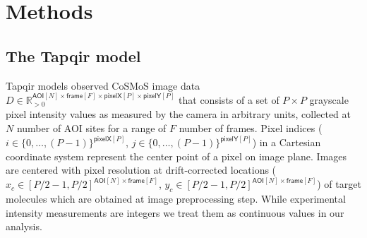 \section*{Methods}

\subsection*{The Tapqir model} 

Tapqir models observed CoSMoS image data $D \in \mathbb{R}_{>0}^{\mathsf{AOI}[N] \times \mathsf{frame}[F] \times \mathsf{pixelX}[P] \times \mathsf{pixelY}[P]}$ that consists of a set of $P \times P$ grayscale pixel intensity values as measured by the camera in arbitrary units, collected at $N$ number of AOI sites for a range of $F$ number of frames. Pixel indices ($i \in \{0, \dots, (P-1)\}^{\mathsf{pixelX}[P]}$, $j \in \{0, \dots, (P-1)\}^{\mathsf{pixelY}[P]}$) in a Cartesian coordinate system represent the center point of a pixel on image plane. Images are centered with pixel resolution at drift-corrected locations ($x_c \in [P/2 - 1, P/2]^{\mathsf{AOI}[N] \times \mathsf{frame}[F]}$, $y_c \in [P/2 - 1, P/2]^{\mathsf{AOI}[N] \times \mathsf{frame}[F]}$) of target molecules which are obtained at image preprocessing step. While experimental intensity measurements are integers we treat them as continuous values in our analysis.

